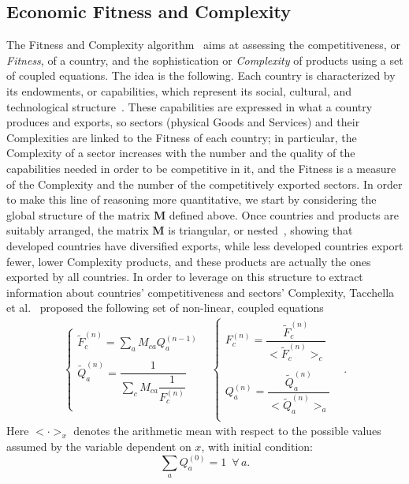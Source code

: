 \documentclass[fleqn,10pt]{article}
\begin{document}
\subsection*{Economic Fitness and Complexity}
The Fitness and Complexity algorithm~\cite{Tacchella2012,Cristelli2013,Pugliese2016} aims at assessing the competitiveness, or \textit{Fitness}, of a country, and the sophistication or \textit{Complexity} of products using a set of coupled equations. 
The idea is the following.
Each country is characterized by its endowments, or capabilities, which represent its social, cultural, and technological structure~\cite{Dosi2000}. 
These capabilities are expressed in what a country produces and exports, so sectors (physical Goods and Services) and their Complexities are linked to the Fitness of each country; in particular, the Complexity of a sector increases with the number and the quality of the capabilities needed in order to be competitive in it, and the Fitness is a measure of the Complexity and the number of the competitively exported sectors. 
In order to make this line of reasoning more quantitative, we start by considering the global structure of the matrix $\textbf{M}$ defined above.
Once countries and products are suitably arranged, the matrix $\textbf{M}$ is triangular, or nested~\cite{Mariani2019}, showing that developed countries have diversified exports, while less developed countries export fewer, lower Complexity products, and these products are actually the ones exported by all countries. 
In order to leverage on this structure to extract information about countries’ competitiveness and sectors’ Complexity, Tacchella et al.~\cite{Tacchella2012} proposed the following set of non-linear, coupled equations
\begin{eqnarray}\label{pilrs1}
	\begin{cases}
		\widetilde{F}_c^{(n)}=\sum_a M_{ca} Q_a^{(n-1)} & \\ \\
		\widetilde{Q}_a^{(n)}=\dfrac{1}{\sum_c M_{ca} \dfrac{1}{F_c^{(n)}}} \\
	\end{cases}
	\begin{cases}
		F_c^{(n)}=\dfrac{\widetilde{F}_c^{(n)}}{<\widetilde{F}_c^{(n)}>_c}  & \\ \\
		Q_a^{(n)}=\dfrac{\widetilde{Q}_a^{(n)}}{<\widetilde{Q}_a^{(n)}>_a}\\ 
	\end{cases}
	\label{eq:f-q}.
\end{eqnarray}
Here $<\cdot>_x$ denotes the arithmetic mean with respect to the possible values assumed by the variable dependent on $x$, with initial condition:
\begin{equation}\label{pilrs2}
	\sum_a Q_a^{(0)}=1   \hspace{6pt}\forall \, a.
\end{equation}
\end{document}
